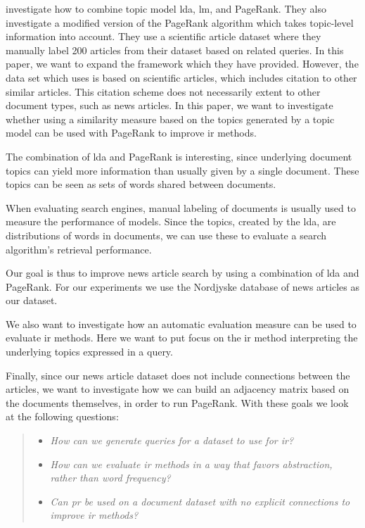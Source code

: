 \citeauthor{yang2009topic}\cite{yang2009topic} investigate how to combine topic model \gls{lda}, \gls{lm}, and PageRank.
They also investigate a modified version of the PageRank algorithm which takes topic-level information into account.
They use a scientific article dataset where they manually label 200 articles from their dataset based on related queries. 
In this paper, we want to expand the framework which they have provided.
However, the data set which \cite{yang2009topic} uses is based on scientific articles, which includes citation to other similar articles.
This citation scheme does not necessarily extent to other document types, such as news articles.
In this paper, we want to investigate whether using a similarity measure based on the topics generated by a topic model can be used with PageRank to improve \gls{ir} methods.

The combination of \gls{lda} and PageRank is interesting, since underlying document topics can yield more information than usually given by a single document.
These topics can be seen as sets of words shared between documents. 

When evaluating search engines, manual labeling of documents is usually used to measure the performance of models\cite{yang2009topic}\cite{Tang2008}.
Since the topics, created by the \gls{lda}, are distributions of words in documents, we can use these to evaluate a search algorithm's retrieval performance. 

Our goal is thus to improve news article search by using a combination of \gls{lda} and PageRank.
For our experiments we use the Nordjyske database of news articles as our dataset.

We also want to investigate how an automatic evaluation measure can be used to evaluate \gls{ir} methods.
Here we want to put focus on the \gls{ir} method interpreting the underlying topics expressed in a query.

Finally, since our news article dataset does not include connections between the articles, we want to investigate how we can build an adjacency matrix based on the documents themselves, in order to run PageRank.
With these goals we look at the following questions:
\begin{quote}
	\begin{itemize}
		\item \emph{How can we generate queries for a dataset to use for \gls{ir}?}
		\item \emph{How can we evaluate \gls{ir} methods in a way that favors abstraction, rather than word frequency?}
	        \item \emph{Can \gls{pr} be used on a document dataset with no explicit connections to improve \gls{ir} methods?}
	\end{itemize}
\end{quote}




